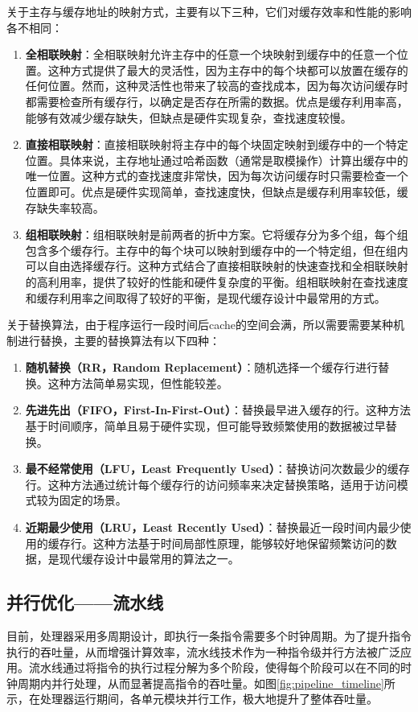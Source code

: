 关于主存与缓存地址的映射方式，主要有以下三种，它们对缓存效率和性能的影响各不相同：
\begin{enumerate}[label={\arabic*)}, itemsep=0pt, parsep=0pt]
	\item \textbf{全相联映射}：全相联映射允许主存中的任意一个块映射到缓存中的任意一个位置。这种方式提供了最大的灵活性，因为主存中的每个块都可以放置在缓存的任何位置。然而，这种灵活性也带来了较高的查找成本，因为每次访问缓存时都需要检查所有缓存行，以确定是否存在所需的数据。优点是缓存利用率高，能够有效减少缓存缺失，但缺点是硬件实现复杂，查找速度较慢。
	\item \textbf{直接相联映射}：直接相联映射将主存中的每个块固定映射到缓存中的一个特定位置。具体来说，主存地址通过哈希函数（通常是取模操作）计算出缓存中的唯一位置。这种方式的查找速度非常快，因为每次访问缓存时只需要检查一个位置即可。优点是硬件实现简单，查找速度快，但缺点是缓存利用率较低，缓存缺失率较高。
	\item \textbf{组相联映射}：组相联映射是前两者的折中方案。它将缓存分为多个组，每个组包含多个缓存行。主存中的每个块可以映射到缓存中的一个特定组，但在组内可以自由选择缓存行。这种方式结合了直接相联映射的快速查找和全相联映射的高利用率，提供了较好的性能和硬件复杂度的平衡。组相联映射在查找速度和缓存利用率之间取得了较好的平衡，是现代缓存设计中最常用的方式。
\end{enumerate}

关于替换算法，由于程序运行一段时间后cache的空间会满，所以需要需要某种机制进行替换，主要的替换算法有以下四种：
\begin{enumerate}[label={\arabic*)}, itemsep=0pt, parsep=0pt]
	\item \textbf{随机替换（RR，Random Replacement）}：随机选择一个缓存行进行替换。这种方法简单易实现，但性能较差。
	\item \textbf{先进先出（FIFO，First-In-First-Out）}：替换最早进入缓存的行。这种方法基于时间顺序，简单且易于硬件实现，但可能导致频繁使用的数据被过早替换。
	\item \textbf{最不经常使用（LFU，Least Frequently Used）}：替换访问次数最少的缓存行。这种方法通过统计每个缓存行的访问频率来决定替换策略，适用于访问模式较为固定的场景。
	\item \textbf{近期最少使用（LRU，Least Recently Used）}：替换最近一段时间内最少使用的缓存行。这种方法基于时间局部性原理，能够较好地保留频繁访问的数据，是现代缓存设计中最常用的算法之一。
\end{enumerate}

\subsection{并行优化——流水线}
目前，处理器采用多周期设计，即执行一条指令需要多个时钟周期。为了提升指令执行的吞吐量，从而增强计算效率，流水线技术作为一种指令级并行方法被广泛应用。流水线通过将指令的执行过程分解为多个阶段，使得每个阶段可以在不同的时钟周期内并行处理，从而显著提高指令的吞吐量。如图\ref{fig:pipeline_timeline}所示，在处理器运行期间，各单元模块并行工作，极大地提升了整体吞吐量。


